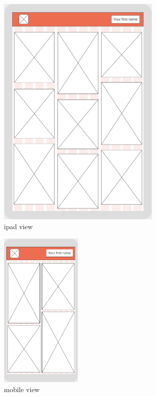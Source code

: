 \documentclass{42-en}
\begin{document}
\begin{figure}[H]
        \begin{center}
            \includegraphics[width=8cm]{wireframe-ipad.png}\\
            ipad view
        \end{center}
\end{figure}
\begin{figure}[H]
        \begin{center}
            \includegraphics[width=4cm]{wireframe-mobile.png}\\
            mobile view
        \end{center}
    \end{figure}
    
\end{document}
